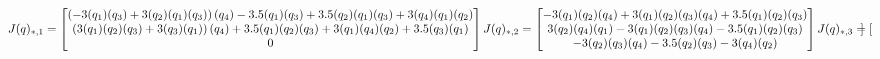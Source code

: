 \documentclass{report}
\let\cos\relax
\let\sin\relax
\newcommand{\sin}[1]{\mathit{S}_{#1}}
\newcommand{\cos}[1]{\mathit{C}_{#1}}
\begin{document}
\begin{equation*}
    
J(q)_{*,1} = 
\begin{bmatrix}
           \left(- 3 \sin{\left(q_{1} \right)} \sin{\left(q_{3} \right)} + 3 \sin{\left(q_{2} \right)} \cos{\left(q_{1} \right)} \cos{\left(q_{3} \right)}\right) \cos{\left(q_{4} \right)} - 3.5 \sin{\left(q_{1} \right)} \sin{\left(q_{3} \right)} + 3.5 \sin{\left(q_{2} \right)} \cos{\left(q_{1} \right)} \cos{\left(q_{3} \right)} + 3 \sin{\left(q_{4} \right)} \cos{\left(q_{1} \right)} \cos{\left(q_{2} \right)} \\
           
           \left(3 \sin{\left(q_{1} \right)} \sin{\left(q_{2} \right)} \cos{\left(q_{3} \right)} + 3 \sin{\left(q_{3} \right)} \cos{\left(q_{1} \right)}\right) \cos{\left(q_{4} \right)} + 3.5 \sin{\left(q_{1} \right)} \sin{\left(q_{2} \right)} \cos{\left(q_{3} \right)} + 3 \sin{\left(q_{1} \right)} \sin{\left(q_{4} \right)} \cos{\left(q_{2} \right)} + 3.5 \sin{\left(q_{3} \right)} \cos{\left(q_{1} \right)} \\
           
           0
\end{bmatrix} \\ \\

J(q)_{*,2} = 
\begin{bmatrix}
           - 3 \sin{\left(q_{1} \right)} \sin{\left(q_{2} \right)} \sin{\left(q_{4} \right)} + 3 \sin{\left(q_{1} \right)} \cos{\left(q_{2} \right)} \cos{\left(q_{3} \right)} \cos{\left(q_{4} \right)} + 3.5 \sin{\left(q_{1} \right)} \cos{\left(q_{2} \right)} \cos{\left(q_{3} \right)}
           \\
           3 \sin{\left(q_{2} \right)} \sin{\left(q_{4} \right)} \cos{\left(q_{1} \right)} - 3 \cos{\left(q_{1} \right)} \cos{\left(q_{2} \right)} \cos{\left(q_{3} \right)} \cos{\left(q_{4} \right)} - 3.5 \cos{\left(q_{1} \right)} \cos{\left(q_{2} \right)} \cos{\left(q_{3} \right)}
           \\
           - 3 \sin{\left(q_{2} \right)} \cos{\left(q_{3} \right)} \cos{\left(q_{4} \right)} - 3.5 \sin{\left(q_{2} \right)} \cos{\left(q_{3} \right)} - 3 \sin{\left(q_{4} \right)} \cos{\left(q_{2} \right)}
           
\end{bmatrix} \\ \\


J(q)_{*,3} = 
\begin{bmatrix}


\end{bmatrix}
\end{equation*}
\end{document}
